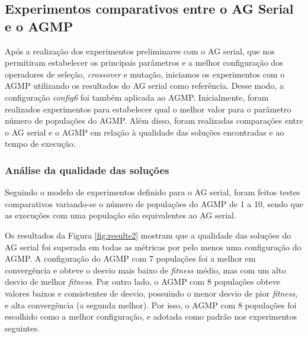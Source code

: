 \documentclass[fleqn,10pt]{SelfArx} %
\begin{document}
\subsection{Experimentos comparativos entre o AG Serial e o AGMP}

Após a realização dos experimentos preliminares com o AG serial, que nos permitiram estabelecer os principais parâmetros e a melhor configuração dos operadores de seleção, \textit{crossover} e mutação, iniciamos os experimentos com o AGMP utilizando os resultados do AG serial como referência. Desse modo, a configuração \textit{config6} foi também aplicada ao AGMP. Inicialmente, foram realizados experimentos para estabelecer qual o melhor valor para o parâmetro número de populações do AGMP. Além disso, foram realizadas comparações entre o AG serial e o AGMP em relação à qualidade das soluções encontradas e ao tempo de execução.

\subsubsection{Análise da qualidade das soluções}

Seguindo o modelo de experimentos definido para o AG serial, foram feitos testes comparativos variando-se o número de populações do AGMP de 1 a 10, sendo que as execuções com uma população são equivalentes ao AG serial.

Os resultados da Figura \ref{fig:results2} mostram que a qualidade das soluções do AG serial foi superada em todas as métricas por pelo menos uma configuração do AGMP. A configuração do AGMP com 7 populações foi a melhor em convergência e obteve o desvio mais baixo de \textit{fitness} médio, mas com um alto desvio de melhor \textit{fitness}. Por outro lado, o AGMP com 8 populações obteve valores baixos e consistentes de desvio, possuindo o menor desvio de pior \textit{fitness}, e alta convergência (a segunda melhor). Por isso, o AGMP com 8 populações foi escolhido como a melhor configuração, e adotada como padrão nos experimentos seguintes.
\end{document}

